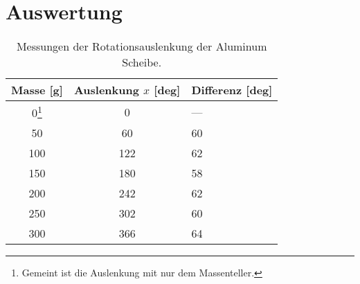 \chapter{Auswertung}

\begin{table}[h!]
    \centering
    \begin{tabular}{c | c | l}
    Masse [g] & Auslenkung $x$ [deg] & Differenz [deg]\\
    \hline
    0\footnote{Gemeint ist die Auslenkung mit nur dem Massenteller.}   & 0   & --- \\
    50  & 60  & 60 \\
    100 & 122 & 62 \\
    150 & 180 & 58 \\
    200 & 242 & 62 \\
    250 & 302 & 60 \\
    300 & 366 & 64 \\
    \hline
    \end{tabular}
    \caption{Messungen der Rotationsauslenkung der Aluminum Scheibe. }
    \label{tab:verschiedene_massen_winkel_auslenkung}
\end{table}